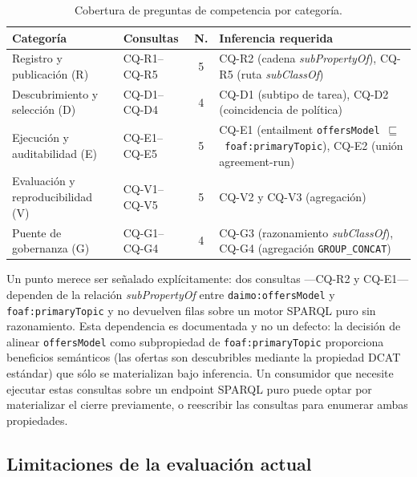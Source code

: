 \documentclass[11pt,a4paper]{article}
\newcommand{\code}[1]{\texttt{#1}}
\newcommand{\cq}[1]{\textsf{#1}}
\begin{document}
\begin{table}[t]
\caption{Cobertura de preguntas de competencia por categoría.}
\label{tab:cqs}
\centering
\small
\begin{tabularx}{\textwidth}{@{}L{4cm}L{4cm}cX@{}}
\toprule
\textbf{Categoría} & \textbf{Consultas} & \textbf{N.} & \textbf{Inferencia requerida} \\
\midrule
Registro y publicación (R) & \cq{CQ-R1}--\cq{CQ-R5} & 5 & \cq{CQ-R2} (cadena \emph{subPropertyOf}), \cq{CQ-R5} (ruta \emph{subClassOf}) \\[0.3em]
Descubrimiento y selección (D) & \cq{CQ-D1}--\cq{CQ-D4} & 4 & \cq{CQ-D1} (subtipo de tarea), \cq{CQ-D2} (coincidencia de política) \\[0.3em]
Ejecución y auditabilidad (E) & \cq{CQ-E1}--\cq{CQ-E5} & 5 & \cq{CQ-E1} (entailment \code{offersModel}~$\sqsubseteq$~\code{foaf:primaryTopic}), \cq{CQ-E2} (unión agreement-run) \\[0.3em]
Evaluación y reproducibilidad (V) & \cq{CQ-V1}--\cq{CQ-V5} & 5 & \cq{CQ-V2} y \cq{CQ-V3} (agregación) \\[0.3em]
Puente de gobernanza (G) & \cq{CQ-G1}--\cq{CQ-G4} & 4 & \cq{CQ-G3} (razonamiento \emph{subClassOf}), \cq{CQ-G4} (agregación \code{GROUP\_CONCAT}) \\
\bottomrule
\end{tabularx}
\end{table}

Un punto merece ser señalado explícitamente: dos consultas ---CQ-R2 y CQ-E1--- dependen de la relación \emph{subPropertyOf} entre \code{daimo:offersModel} y \code{foaf:primaryTopic} y no devuelven filas sobre un motor SPARQL puro sin razonamiento. Esta dependencia es documentada y no un defecto: la decisión de alinear \code{offersModel} como subpropiedad de \code{foaf:primaryTopic} proporciona beneficios semánticos (las ofertas son descubribles mediante la propiedad DCAT estándar) que sólo se materializan bajo inferencia. Un consumidor que necesite ejecutar estas consultas sobre un endpoint SPARQL puro puede optar por materializar el cierre previamente, o reescribir las consultas para enumerar ambas propiedades.

\subsection{Limitaciones de la evaluación actual}
\end{document}
